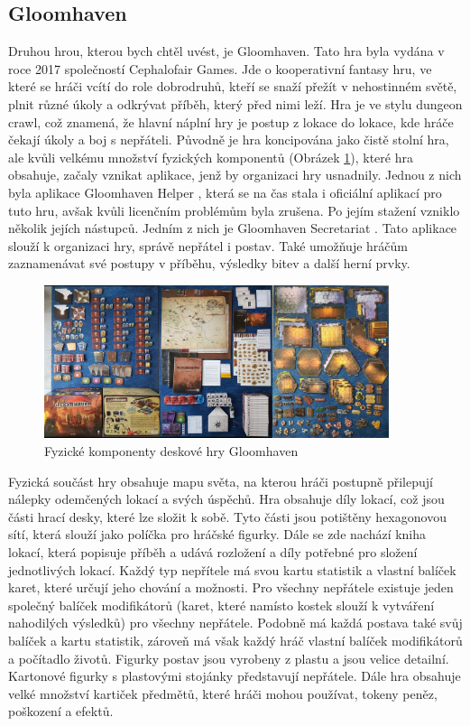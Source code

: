\subsection{Gloomhaven}
Druhou hrou, kterou bych chtěl uvést, je Gloomhaven. Tato hra byla vydána v roce 2017 společností Cephalofair Games. Jde o kooperativní fantasy hru, ve které se hráči vcítí do role dobrodruhů, kteří se snaží přežít v nehostinném světě, plnit různé úkoly a odkrývat příběh, který před nimi leží. Hra je ve stylu dungeon crawl, což znamená, že hlavní náplní hry je postup z lokace do lokace, kde hráče čekají úkoly a boj s nepřáteli. Původně je hra koncipována jako čistě stolní hra, ale kvůli velkému množství fyzických komponentů (Obrázek \ref{fig:gloomhaven_contents}), které hra obsahuje, začaly vznikat aplikace, jenž by organizaci hry usnadnily. Jednou z nich byla aplikace Gloomhaven Helper \cite{gloomhaven_helper}, která se na čas stala i oficiální aplikací pro tuto hru, avšak kvůli licenčním problémům byla zrušena. Po jejím stažení vzniklo několik jejích nástupců. Jedním z nich je Gloomhaven Secretariat \cite{gloomhaven_secretariat}. Tato aplikace slouží k organizaci hry, správě nepřátel i postav. Také umožňuje hráčům zaznamenávat své postupy v příběhu, výsledky bitev a další herní prvky.

\begin{figure}[H]
    \centering
    \includegraphics[width=0.9\textwidth]{resources/figures/gloomhaven.png}
    \caption{Fyzické komponenty deskové hry Gloomhaven \cite{gloomhaven}}
    \label{fig:gloomhaven_contents}
\end{figure}

Fyzická součást hry obsahuje mapu světa, na kterou hráči postupně přilepují nálepky odemčených lokací a svých úspěchů. Hra obsahuje díly lokací, což jsou části hrací desky, které lze složit k sobě. Tyto části jsou potištěny hexagonovou sítí, která slouží jako políčka pro hráčské figurky. Dále se zde nachází kniha lokací, která popisuje příběh a udává rozložení a díly potřebné pro složení jednotlivých lokací. Každý typ nepřítele má svou kartu statistik a vlastní balíček karet, které určují jeho chování a možnosti. Pro všechny nepřátele existuje jeden společný balíček modifikátorů (karet, které namísto kostek slouží k vytváření nahodilých výsledků) pro všechny nepřátele. Podobně má každá postava také svůj balíček a kartu statistik, zároveň má však každý hráč vlastní balíček modifikátorů a počítadlo životů. Figurky postav jsou vyrobeny z plastu a jsou velice detailní. Kartonové figurky s plastovými stojánky představují nepřátele. Dále hra obsahuje velké množství kartiček předmětů, které hráči mohou používat, tokeny peněz, poškození a efektů.